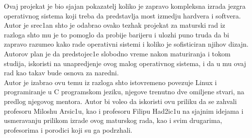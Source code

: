 \documentclass[a4paper,fleqn,12pt]{JMThesis}
\newcommand\eng{\fontencoding{OT1}\fontfamily{\rmdefault}\selectfont}
\begin{document}
\newpage

Ovaj projekat je bio sjajan pokazatelj koliko je zapravo kompleksna izrada
jezgra operativnog sistema koji treba da predstavlja most izmedju hardvera i
softvera. Autor je srec1an shto je odabrao ovako tezhak projekat za maturski
rad iz razloga shto mu je to pomoglo da probije barijeru i ulozhi puno truda da
bi zapravo razumeo kako rade operativni sistemi i koliko je sofisticiran
njihov dizajn.\\

Autorov plan je da predstojec1e slobodno vreme nakon maturiranja i tokom
studija, iskoristi na unapredjenje ovog malog operativnog sistema, i da u mu
ovaj rad kao takav bude osnova za naredni.\\

Autor je izabrao ovu temu iz razloga shto istovremeno povezuje {\eng Linux} i
programiranje u {\eng C} programskom jeziku, njegove trenutno dve omiljene
stvari, na predlog njegovog mentora. Autor bi voleo da iskoristi ovu priliku da
se zahvali profesoru Miloshu Arsic1u, kao i profesoru Filipu Had2ic1u na
sjajnim idejama i usmeravanju prilikom izrade ovog maturskog rada, kao i svim
drugarima, profesorima i porodici koji su ga podrzhali.


\thispagestyle{empty}
\mbox{}
\clearpage

\nocite{*}
\printbibliography[heading=bibintoc,title={Literatura}]
\end{document}
